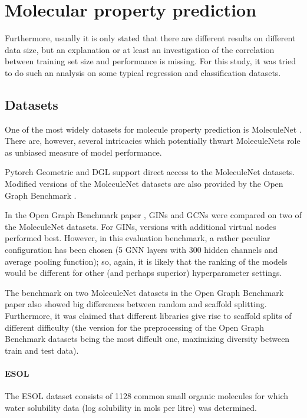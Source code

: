 \chapter{Molecular property prediction}

Furthermore, usually it is only stated that there are different results on different data size, but an explanation or at least an investigation of the correlation between training set size and performance is missing. For this study, it was tried to do such an analysis on some typical regression and classification datasets.


\section{Datasets}


One of the most widely datasets for molecule property prediction is MoleculeNet \cite{Wu.2018}. There are, however, several intricacies which potentially thwart MoleculeNets role as unbiased measure of model performance.

Pytorch Geometric and DGL support direct access to the MoleculeNet datasets.
Modified versions of the MoleculeNet datasets are also provided by the Open Graph Benchmark \cite{Hu.02.05.2020}. 

In the Open Graph Benchmark paper \cite{Hu.02.05.2020}, GINs and GCNs were compared on two of the MoleculeNet datasets. For GINs, versions with additional virtual nodes performed best.
However, in this evaluation benchmark, a rather peculiar configuration has been chosen (5 GNN layers with 300 hidden channels and average pooling function); so, again, it is likely that the ranking of the models would be different for other (and perhaps superior) hyperparameter settings.

The benchmark on two MoleculeNet datasets in the Open Graph Benchmark paper \cite{Hu.02.05.2020} also showed big differences between random and scaffold splitting. Furthermore, it was claimed that different libraries give rise to scaffold splits of different difficulty (the version for the preprocessing of the Open Graph Benchmark datasets being the most diffcult one, maximizing diversity between train and test data). 



\subsubsection{ESOL}

The ESOL dataset consists of 1128 common small organic molecules for which water solubility data (log solubility in mols per litre) was determined. \cite{Delaney.2004}

